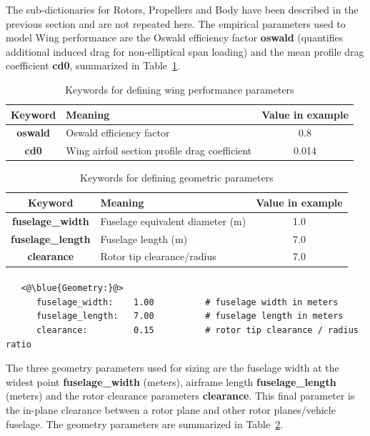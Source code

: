 The sub-dictionaries for Rotors, Propellers and Body have been described in the previous section and are not repeated here. The empirical parameters used to model Wing performance are the Oswald efficiency factor \textbf{oswald} (quantifies additional induced drag for non-elliptical span loading) and the mean profile drag coefficient \textbf{cd0}, summarized in Table~\ref{tbl:wing_aero_keywords}. 

\begin{center}
  \begin{table}[H]
	\caption{Keywords for defining wing performance parameters}
	\label{tbl:wing_aero_keywords}
    \begin{tabular}{| c | l | c |}
    \hline
    Keyword & Meaning & Value in example \\ 
    \hline
\textbf{oswald} & Oswald efficiency factor &  0.8 \\
\textbf{cd0} &  Wing airfoil section profile drag coefficient & 0.014 \\
     \hline
  \end{tabular}
\end{table}
\end{center}
\vspace{-2cm}

\begin{center}
  \begin{table}[h]
	\caption{Keywords for defining geometric parameters}
	\label{tbl:geometry_keywords}
    \begin{tabular}{| c | l | c |}
    \hline
    Keyword & Meaning & Value in example \\ 
    \hline
\textbf{fuselage\_width} & Fuselage equivalent diameter (m) &  1.0 \\
\textbf{fuselage\_length} &  Fuselage length (m) & 7.0 \\
\textbf{clearance} &  Rotor tip clearance/radius & 7.0 \\
     \hline
  \end{tabular}
\end{table}
\end{center}
\vspace{-2cm}
\paragraph{}
\begin{lstlisting}
   <@\blue{Geometry:}@>
      fuselage_width:    1.00          # fuselage width in meters
      fuselage_length:   7.00          # fuselage length in meters
      clearance:         0.15          # rotor tip clearance / radius ratio
\end{lstlisting}
The three geometry parameters used for sizing are the fuselage width at the widest point \textbf{fuselage\_width} (meters), airframe length \textbf{fuselage\_length} (meters) and the rotor clearance parameters \textbf{clearance}. This final parameter is the in-plane clearance between a rotor plane and other rotor planes/vehicle fuselage. The geometry parameters are summarized in Table~\ref{tbl:geometry_keywords}.

